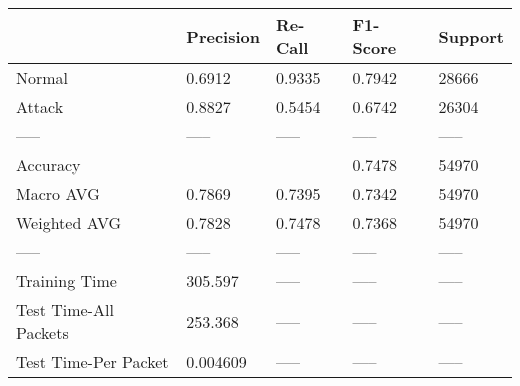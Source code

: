 \begin{tabular}{lllll}
\toprule
{} & Precision & Re-Call & F1-Score & Support \\
\midrule
Normal                &    0.6912 &  0.9335 &   0.7942 &   28666 \\
Attack                &    0.8827 &  0.5454 &   0.6742 &   26304 \\
-----                 &     ----- &   ----- &    ----- &   ----- \\
Accuracy              &           &         &   0.7478 &   54970 \\
Macro AVG             &    0.7869 &  0.7395 &   0.7342 &   54970 \\
Weighted AVG          &    0.7828 &  0.7478 &   0.7368 &   54970 \\
-----                 &     ----- &   ----- &    ----- &   ----- \\
Training Time         &   305.597 &   ----- &    ----- &   ----- \\
Test Time-All Packets &   253.368 &   ----- &    ----- &   ----- \\
Test Time-Per Packet  &  0.004609 &   ----- &    ----- &   ----- \\
\bottomrule
\end{tabular}
